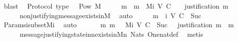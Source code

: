 \begin{isabellebody}
\ blast\isanewline
{}\isamarkupfalse%
%
\endisatagproof
{\isafoldproof}%
%
\isadelimproof
\isanewline
%
\endisadelimproof
\isanewline
{}\isamarkupfalse%
\ {\isacharparenleft}\ Protocol{\isacharparenright}\ {\isasymSigma}{\isacharunderscore}type{\isacharcolon}\ {\isachardoublequoteopen}{\isasymSigma}\ {\isasymsubset}\ Pow\ M{\isachardoublequoteclose}\isanewline
%
\isadelimproof
%
\endisadelimproof
%
\isatagproof
{}\isamarkupfalse%
\ {\isacharminus}\isanewline
\ \ \isamarkupfalse%
\ m\ \ {\isachardoublequoteopen}m\ {\isasymin}\ Mi\ {\isacharparenleft}V{\isacharcomma}\ C{\isacharcomma}\ {\isasymepsilon}{\isacharparenright}\ {}\ {\isasymand}\ justification\ m\ {\isacharequal}\ {\isasymemptyset}{\isachardoublequoteclose}\isanewline
\ \ \ \ \isamarkupfalse%
\ non{\isacharunderscore}justifying{\isacharunderscore}message{\isacharunderscore}exists{\isacharunderscore}in{\isacharunderscore}M{\isacharunderscore}{}\ \isamarkupfalse%
\ auto\isanewline
\ \ \isamarkupfalse%
\ \isamarkupfalse%
\ {\isachardoublequoteopen}{\isacharbraceleft}m{\isacharbraceright}\ {\isasymin}\ {\isasymSigma}i\ {\isacharparenleft}V{\isacharcomma}\ C{\isacharcomma}\ {\isasymepsilon}{\isacharparenright}\ {\isacharparenleft}Suc\ {}{\isacharparenright}{\isachardoublequoteclose}\isanewline
\ \ \ \ \isamarkupfalse%
\ Params{\isachardot}{\isasymSigma}i{\isacharunderscore}subset{\isacharunderscore}Mi\ \isamarkupfalse%
\ auto\isanewline
\ \ \isamarkupfalse%
\ \isamarkupfalse%
\ {\isachardoublequoteopen}{\isasymexists}\ m{\isacharprime}{\isachardot}\ m{\isacharprime}\ {\isasymin}\ \ Mi\ {\isacharparenleft}V{\isacharcomma}\ C{\isacharcomma}\ {\isasymepsilon}{\isacharparenright}\ {\isacharparenleft}Suc\ {}{\isacharparenright}\ {\isasymand}\ justification\ m{\isacharprime}\ {\isacharequal}\ {\isacharbraceleft}m{\isacharbraceright}{\isachardoublequoteclose}\isanewline
\ \ \ \ \isamarkupfalse%
\ message{\isacharunderscore}justifying{\isacharunderscore}state{\isacharunderscore}in{\isacharunderscore}{\isasymSigma}{\isacharunderscore}n{\isacharunderscore}exists{\isacharunderscore}in{\isacharunderscore}M{\isacharunderscore}n\ Nats{\isacharunderscore}{}\ One{\isacharunderscore}nat{\isacharunderscore}def\ \isamarkupfalse%
\ metis\isanewline
\ \ \isamarkupfalse%
\ \isamarkupfalse%

\end{isabellebody}
